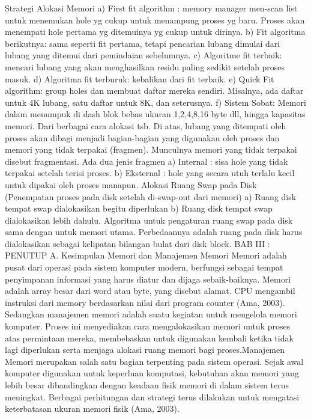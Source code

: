 Strategi Alokasi Memori
a) First fit algorithm : memory  manager men-scan list untuk  menemukan hole yg cukup untuk menampung proses yg baru. Proses akan menempati hole pertama yg ditemuinya yg cukup untuk dirinya.
b) Fit algoritma berikutnya: sama seperti fit pertama, tetapi pencarian lubang dimulai dari lubang yang ditemui dari pemindaian sebelumnya.
c) Algoritme fit terbaik: mencari lubang yang akan menghasilkan residu paling sedikit setelah proses masuk.
d) Algoritma fit terburuk: kebalikan dari fit terbaik.
e) Quick Fit algorithm: group holes dan membuat daftar mereka sendiri. Misalnya, ada daftar untuk 4K lubang, satu daftar untuk 8K, dan seterusnya.
f) Sistem Sobat: Memori dalam menumpuk di dash blok bebas ukuran 1,2,4,8,16 byte dll, hingga kapasitas memori.
Dari berbagai cara alokasi tsb. Di atas, lubang yang ditempati oleh proses akan dibagi menjadi bagian-bagian yang digunakan oleh proses dan memori yang tidak terpakai (fragmen). Munculnya memori yang tidak terpakai disebut fragmentasi. Ada dua jenis fragmen
a)      Internal : sisa hole yang tidak terpakai setelah terisi proses.
b)      Eksternal : hole yang secara utuh terlalu kecil untuk dipakai oleh proses manapun.
Alokasi Ruang Swap pada Disk (Penempatan proses pada disk setelah di-swap-out dari memori)
a)      Ruang disk tempat swap dialokasikan begitu diperlukan
b)      Ruang disk tempat swap dialokasikan lebih dahulu.
Algoritma untuk pengaturan ruang swap pada disk sama dengan  untuk memori utama. Perbedaannya adalah ruang pada disk harus dialokasikan sebagai kelipatan bilangan bulat dari disk block.
BAB III : PENUTUP
A. Kesimpulan
Memori dan Manajemen Memori
Memori adalah pusat dari operasi pada sistem komputer modern, berfungsi sebagai tempat penyimpanan informasi yang harus diatur dan dijaga sebaik-baiknya. Memori adalah array besar dari word atau byte, yang disebut alamat. CPU mengambil instruksi dari memory berdasarkan nilai dari program counter (Ama, 2003).
Sedangkan manajemen memori adalah suatu kegiatan untuk mengelola memori komputer. Proses ini menyediakan cara mengalokasikan memori untuk proses atas permintaan mereka, membebaskan untuk digunakan kembali ketika tidak lagi diperlukan serta menjaga alokasi ruang memori bagi proses.Manajemen Memori merupakan salah satu bagian terpenting pada sistem operasi. Sejak awal komputer digunakan untuk keperluan komputasi, kebutuhan akan memori yang lebih besar dibandingkan dengan keadaan fisik memori di dalam sistem terus meningkat. Berbagai perhitungan dan strategi terus dilakukan untuk mengatasi keterbatasan ukuran memori fisik (Ama, 2003).
